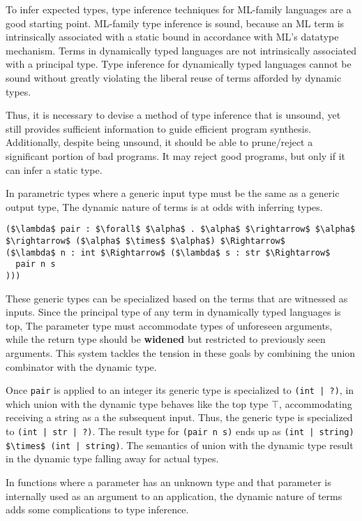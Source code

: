 \documentclass[sigplan,screen]{acmart}
\begin{document}
To infer expected types, type inference techniques for ML-family languages 
are a good starting point.
ML-family type inference is sound, because an ML term is 
intrinsically associated with a static bound in accordance with ML's datatype mechanism.
Terms in dynamically typed languages are not intrinsically associated with a principal type. 
Type inference for dynamically typed languages cannot be sound without greatly violating the 
liberal reuse of terms afforded by dynamic types. 

Thus, it is necessary to devise a method of type inference that is unsound, 
yet still provides sufficient information to guide efficient program synthesis.
Additionally, despite being unsound, it should be able to prune/reject 
a significant portion of bad programs. 
It may reject good programs, but only if it can infer a static type.

In parametric types where a generic input type must be the same as a generic output type,
The dynamic nature of terms is at odds with inferring types.

\begin{lstlisting}
($\lambda$ pair : $\forall$ $\alpha$ . $\alpha$ $\rightarrow$ $\alpha$ $\rightarrow$ ($\alpha$ $\times$ $\alpha$) $\Rightarrow$ 
($\lambda$ n : int $\Rightarrow$ ($\lambda$ s : str $\Rightarrow$ 
  pair n s
)))
\end{lstlisting}

\noindent These generic types can be specialized based on the terms that are witnessed as inputs. 
Since the principal type of any term in dynamically typed languages is top, 
The parameter type must accommodate types of unforeseen arguments, 
while the return type should be \textbf{widened} but restricted 
to previously seen arguments.
This system tackles the tension in these goals by combining the union combinator  
with the dynamic type. 

Once \lstinline{pair} is applied to an integer its generic type is specialized to 
\lstinline{(int | ?)}, 
in which union with the dynamic type behaves like the top type $\top$, 
accommodating receiving a string as a the subsequent input.
Thus, the generic type is specialized to \lstinline{(int | str | ?)}.
The result type for \lstinline{(pair n s)} ends up as 
\lstinline{(int | string) $\times$ (int | string)}. 
The semantics of union with the dynamic type result in the dynamic type 
falling away for actual types.

In functions where a parameter has an unknown type and that parameter is 
internally used as an argument to an application, the dynamic nature of terms  
adds some complications to type inference.
\end{document}
